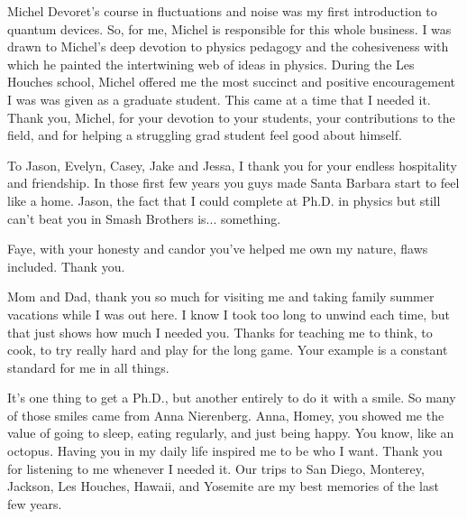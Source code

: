 \begin{acknowledgements}
Michel Devoret's course in fluctuations and noise was my first introduction to quantum devices.
So, for me, Michel is responsible for this whole business.
I was drawn to Michel's deep devotion to physics pedagogy and the cohesiveness with which he painted the intertwining web of ideas in physics.
During the Les Houches school, Michel offered me the most succinct and positive encouragement I was was given as a graduate student.
This came at a time that I needed it.
Thank you, Michel, for your devotion to your students, your contributions to the field, and for helping a struggling grad student feel good about himself.

To Jason, Evelyn, Casey, Jake and Jessa, I thank you for your endless hospitality and friendship.
In those first few years you guys made Santa Barbara start to feel like a home.
Jason, the fact that I could complete at Ph.D. in physics but still can't beat you in Smash Brothers is... something.

Faye, with your honesty and candor you've helped me own my nature, flaws included.
Thank you.

Mom and Dad, thank you so much for visiting me and taking family summer vacations while I was out here.
I know I took too long to unwind each time, but that just shows how much I needed you.
Thanks for teaching me to think, to cook, to try really hard and play for the long game.
Your example is a constant standard for me in all things.

It's one thing to get a Ph.D., but another entirely to do it with a smile.
So many of those smiles came from Anna Nierenberg.
Anna, Homey, you showed me the value of going to sleep, eating regularly, and just being happy.
You know, like an octopus.
Having you in my daily life inspired me to be who I want.
Thank you for listening to me whenever I needed it.
Our trips to San Diego, Monterey, Jackson, Les Houches, Hawaii, and Yosemite are my best memories of the last few years.

\end{acknowledgements}
